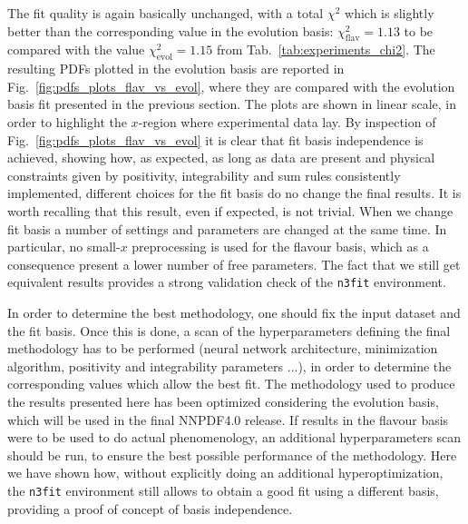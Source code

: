 %
The fit quality is again basically unchanged, with a total $\chi^2$ which is slightly better than the corresponding 
value in the evolution basis: $\chi_{\text{flav}}^2=1.13$ to be compared with the value $\chi_{\text{evol}}^2=1.15$ 
from Tab.~\ref{tab:experiments_chi2}.
The resulting PDFs plotted in the evolution basis are reported in Fig.~\ref{fig:pdfs_plots_flav_vs_evol}, 
where they are compared with the evolution basis fit presented in the previous section.
The plots are shown in linear scale, in order to highlight the $x$-region where experimental data lay.
By inspection of Fig.~\ref{fig:pdfs_plots_flav_vs_evol} it is clear that fit basis independence is achieved,
showing how, as expected, as long as data are present and physical constraints given by positivity, integrability and sum rules
consistently implemented, different choices for the fit basis do no change the final results.
It is worth recalling that this result, even if expected, is not trivial. When we change fit basis a number
of settings and parameters are changed at the same time. In particular, no small-$x$ preprocessing
is used for the flavour basis, which as a consequence present a lower number of free parameters.
The fact that we still get equivalent results provides a strong validation check of the {\tt n3fit} environment.

%
In order to determine the best methodology, one should fix the input dataset and the fit basis. Once this is done,
a scan of the hyperparameters defining the final methodology has to be performed 
(neural network architecture, minimization algorithm, positivity and integrability parameters ...), in order to determine
the corresponding values which allow the best fit.
The methodology used to produce the results presented here has been optimized considering the evolution basis,
which will be used in the final NNPDF4.0 release.  
If results in the flavour basis were to be used to do actual phenomenology, an additional hyperparameters scan
should be run, to ensure the best possible performance of the methodology. 
Here we have shown how, without explicitly doing an additional hyperoptimization, the {\tt n3fit} environment still
allows to obtain a good fit using a different basis, providing a proof of concept of basis independence.


